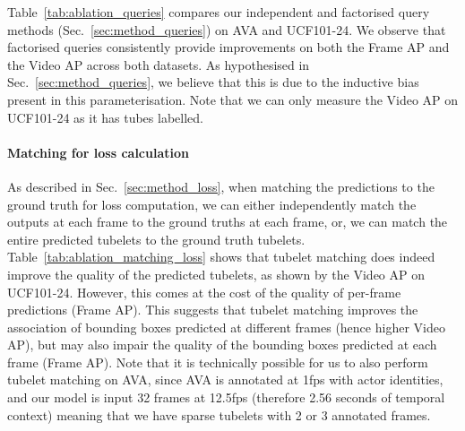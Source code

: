 \documentclass[10pt,twocolumn,letterpaper]{article}
\def \paravspace {-0.7\baselineskip}
\begin{document}
\begin{table}
    \centering
    \caption{Comparison of independent and tubelet matching for computing the loss on AVA and UCF101-24.
    Tubelet matching helps for tube-level evaluation metrics like the Video AP (vAP) on UCF101-24.
    Note that tubelet matching is actually still possible on AVA as the annotations are at 1fps with actor identities.}
\label{tab:ablation_matching_loss}
\vspace{-\baselineskip}
\end{table}
 
Table~\ref{tab:ablation_queries} compares our independent and factorised query methods (Sec.~\ref{sec:method_queries}) on AVA and UCF101-24.
We observe that factorised queries consistently provide improvements on both the Frame AP and the Video AP across both datasets.
As hypothesised in Sec.~\ref{sec:method_queries}, we believe that this is due to the inductive bias present in this parameterisation.
Note that we can only measure the Video AP on UCF101-24 as it has tubes labelled.

\vspace{\paravspace}
\paragraph{Matching for loss calculation}
As described in Sec.~\ref{sec:method_loss}, when matching the predictions to the ground truth for loss computation, we can either independently match the outputs at each frame to the ground truths at each frame, or, we can match the entire predicted tubelets to the ground truth tubelets.
Table~\ref{tab:ablation_matching_loss} shows that tubelet matching does indeed improve the quality of the predicted tubelets, as shown by the Video AP on UCF101-24.
However, this comes at the cost of the quality of per-frame predictions (\ie Frame AP).
This suggests that tubelet matching improves the association of bounding boxes predicted at different frames (hence higher Video AP), but may also impair the quality of the bounding boxes predicted at each frame (Frame AP).
Note that it is technically possible for us to also perform tubelet matching on AVA, since AVA is annotated at 1fps with actor identities, and our model is input 32 frames at 12.5fps (therefore 2.56 seconds of temporal context) meaning that we have sparse tubelets with 2 or 3 annotated frames.
\end{document}
